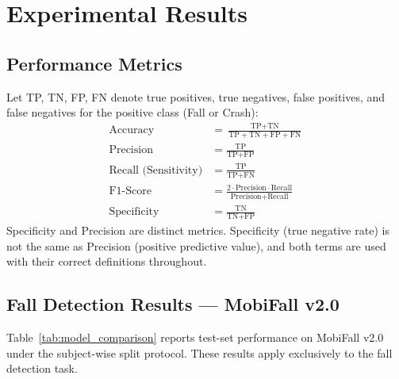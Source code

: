 \documentclass[12pt,a4paper]{article}
\begin{document}
\section{Experimental Results}
\label{sec:results}

\subsection{Performance Metrics}
\label{sec:metrics}

Let TP, TN, FP, FN denote true positives, true negatives, false positives,
and false negatives for the positive class (Fall or Crash):
\begin{align}
  \text{Accuracy}    &=\frac{\text{TP}+\text{TN}}
    {\text{TP}+\text{TN}+\text{FP}+\text{FN}} \label{eq:acc}\\[4pt]
  \text{Precision}   &=\frac{\text{TP}}{\text{TP}+\text{FP}} \label{eq:prec}\\[4pt]
  \text{Recall (Sensitivity)}&=\frac{\text{TP}}{\text{TP}+\text{FN}} \label{eq:rec}\\[4pt]
  \text{F1-Score}    &=\frac{2\cdot\text{Precision}\cdot\text{Recall}}
    {\text{Precision}+\text{Recall}} \label{eq:f1}\\[4pt]
  \text{Specificity} &=\frac{\text{TN}}{\text{TN}+\text{FP}} \label{eq:spec}
\end{align}
Specificity and Precision are distinct metrics. Specificity (true negative
rate) is not the same as Precision (positive predictive value), and both
terms are used with their correct definitions throughout.

\subsection{Fall Detection Results --- MobiFall v2.0}
\label{sec:fall_results}

Table~\ref{tab:model_comparison} reports test-set performance on MobiFall v2.0
under the subject-wise split protocol. These results apply exclusively to the
fall detection task.
\end{document}
